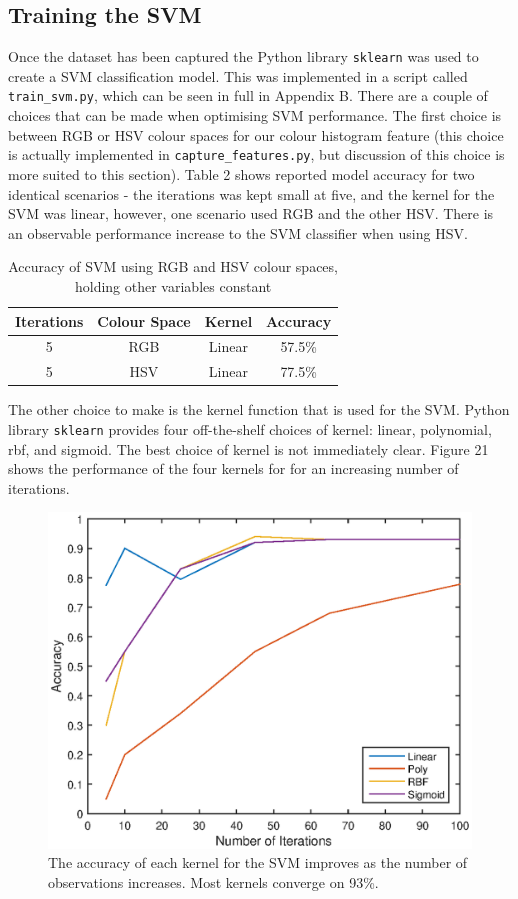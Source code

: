 \documentclass[a4paper]{article}
\begin{document}
\subsection{Training the SVM}
Once the dataset has been captured the Python library \verb|sklearn| was used to create a SVM classification model. This was implemented in a script called \verb|train_svm.py|, which can be seen in full in Appendix B. There are a couple of choices that can be made when optimising SVM performance. The first choice is between RGB or HSV colour spaces for our colour histogram feature (this choice is actually implemented in \verb|capture_features.py|, but discussion of this choice is more suited to this section). Table 2 shows reported model accuracy for two identical scenarios - the iterations was kept small at five, and the kernel for the SVM was linear, however,  one scenario used RGB and the other HSV. There is an observable performance increase to the SVM classifier when using HSV.
\begin{table}[h]
	\centering
	\caption{Accuracy of SVM using RGB and HSV colour spaces, holding other variables constant}
	\begin{tabular}{cccc}
		\toprule
		\textbf{Iterations} & \textbf{Colour Space} & \textbf{Kernel} & \textbf{Accuracy}\\
		\midrule
		5 & RGB & Linear & 57.5\%\\
		5 & HSV & Linear & 77.5\%\\
		\bottomrule
	\end{tabular}
\end{table}

The other choice to make is the kernel function that is used for the SVM. Python library \verb|sklearn| provides four off-the-shelf choices of kernel: linear, polynomial, rbf, and sigmoid. The best choice of kernel is not immediately clear. Figure 21 shows the performance of the four kernels for for an increasing number of iterations.  
\begin{figure}[h]
	\centering
	\includegraphics[scale=0.6]{kernels}
	\caption{The accuracy of each kernel for the SVM improves as the number of observations increases. Most kernels converge on 93\%.}
\end{figure}
\end{document}
